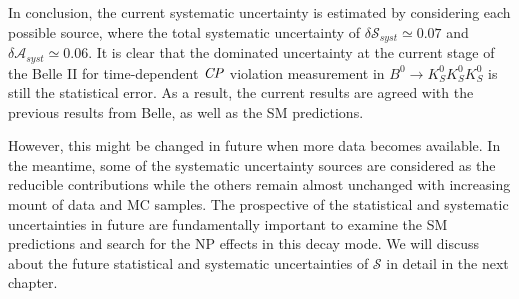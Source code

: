 In conclusion, the current systematic uncertainty is estimated by considering each possible source, where the total systematic uncertainty of $\delta \mathcal{S}_{syst} \simeq 0.07$ and $\delta \mathcal{A}_{syst} \simeq 0.06$. It is clear that the dominated uncertainty at the current stage of the Belle II for time-dependent $\it{CP}$ violation measurement in $B^0 \to K_S^0  K_S^0  K_S^0$ is still the statistical error. As a result, the 
current results are agreed with the previous results from Belle, as well as the SM predictions.

However, this might be changed in future when more data becomes available. In the meantime, some of the systematic uncertainty sources are considered as the reducible contributions while the others remain almost unchanged with increasing mount of data and MC samples. The prospective of the statistical and systematic uncertainties in future are fundamentally important to examine the SM predictions and search for the NP effects in this decay mode. We will discuss about the future statistical and systematic uncertainties of $\mathcal{S}$ in detail in the next chapter.


